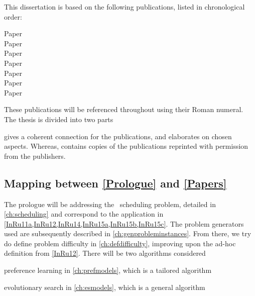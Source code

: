 This dissertation is based on the following publications, listed in 
chronological order:
{\raggedright
\begin{description} 
    \item[Paper ] 
    \item[Paper ] 
    \item[Paper  ] 
    \item[Paper  ] 
    \item[Paper ] 
    \item[Paper ] 
    \item[Paper ] 
\end{description}}

\noindent These publications will be referenced throughout using their Roman 
numeral. 
The thesis is divided into two parts
\begin{enumerate*}[label={{}}]
    \item \emph{}
    \item \emph{}
\end{enumerate*}
 gives a coherent connection for the publications, and 
elaborates on chosen aspects. Whereas,  contains copies of the 
publications reprinted with permission from the publishers.

\clearpage
\subsection*{Mapping between \cref{Prologue} and \cref{Papers}}
The prologue will be addressing the \jsp\ scheduling problem, detailed in 
\cref{ch:scheduling} and correspond to the application in 
\cref{InRu11a,InRu12,InRu14,InRu15a,InRu15b,InRu15c}. The problem generators 
used are subsequently described in \cref{ch:genprobleminstances}.
From there, we try do define problem difficulty in \cref{ch:defdifficulty}, 
improving upon the ad-hoc definition from \cref{InRu12}. 
There will be two algorithms considered
\begin{enumerate*}
    \item preference learning in \cref{ch:prefmodels}, which is a tailored 
    algorithm
    \item evolutionary search in \cref{ch:esmodels}, which is a general 
    algorithm
\end{enumerate*}

